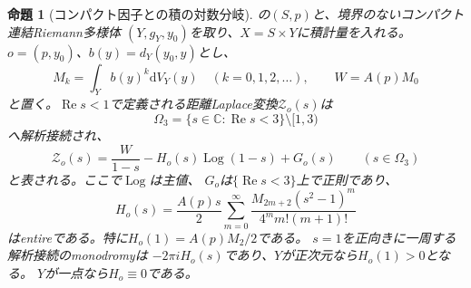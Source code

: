 \documentclass[11pt,a4paper]{ltjsarticle}
\newcommand{\CC}{\mathbb C}
\newcommand{\dd}{\mathrm d}
\theoremstyle{plain}
\newtheorem{proposition}[proposition]{命題}
\theoremstyle{definition}
\theoremstyle{remark}
\begin{document}
\begin{proposition}[コンパクト因子との積の対数分岐]
\label{prop:compact-product-logarithmic-germ}
の$(S,p)$と、境界のないコンパクト連結Riemann多様体
$(Y,g_Y,y_0)$を取り、$X=S\times Y$に積計量を入れる。
$o=(p,y_0)$、$b(y)=d_Y(y_0,y)$とし、
\[
 M_k=\int_Y b(y)^k\dd V_Y(y)\quad(k=0,1,2,\ldots),\qquad
 W=A(p)M_0
\]
と置く。$\operatorname{Re}s<1$で定義される距離Laplace変換$\mathcal Z_o(s)$は
\[
 \Omega_3=\{s\in\CC:\operatorname{Re}s<3\}\setminus[1,3)
\]
へ解析接続され、
\begin{equation}
\label{eq:compact-product-logarithmic-germ}
 \mathcal Z_o(s)=\frac{W}{1-s}
       -H_o(s)\operatorname{Log}(1-s)+G_o(s)
 \qquad(s\in\Omega_3)
\end{equation}
と表される。ここで$\operatorname{Log}$は主値、
$G_o$は$\{\operatorname{Re}s<3\}$上で正則であり、
\begin{equation}
\label{eq:compact-product-log-coefficient}
 H_o(s)=\frac{A(p)s}{2}
   \sum_{m=0}^{\infty}
   \frac{M_{2m+2}(s^2-1)^m}{4^m m!(m+1)!}
\end{equation}
はentireである。特に$H_o(1)=A(p)M_2/2$である。
$s=1$を正向きに一周する解析接続のmonodromyは
$-2\pi iH_o(s)$であり、$Y$が正次元なら$H_o(1)>0$となる。
$Y$が一点なら$H_o\equiv0$である。
\end{proposition}
\end{document}
